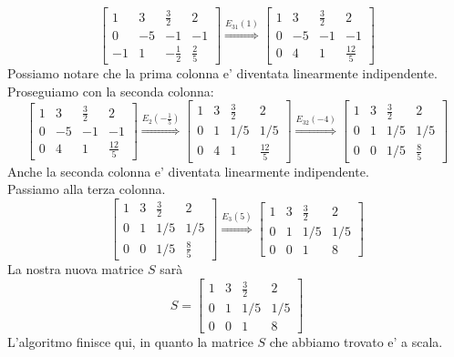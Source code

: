 \documentclass[a4paper, 10pt]{article}
\begin{document}
	\[
		\begin{bmatrix}
			1 & 3 & \frac{3}{2} & 2 \\
			0 & -5 & -1 & -1 \\
			-1 & 1 & -\frac{1}{2} &  \frac{2}{5}
		\end{bmatrix}
		\stackrel{E_{31}(1)}{\Longrightarrow}	
		\begin{bmatrix}
			1 & 3 & \frac{3}{2} & 2 \\
			0 & -5 & -1 & -1 \\
			0 & 4 & 1 &  \frac{12}{5}
		\end{bmatrix}
	\] 
	Possiamo notare che la prima colonna e' diventata linearmente indipendente. \\
	Proseguiamo con la seconda colonna:
	\[
		\begin{bmatrix}
			1 & 3 & \frac{3}{2} & 2 \\
			0 & -5 & -1 & -1 \\
			0 & 4 & 1 &  \frac{12}{5}
		\end{bmatrix}
		\stackrel{E_{2}(- \frac{1}{5})}{\Longrightarrow}
		\begin{bmatrix}
			1 & 3 & \frac{3}{2} & 2 \\
			0 & 1 & 1/5 & 1/5 \\
			0 & 4 & 1 &  \frac{12}{5}
		\end{bmatrix}
		\stackrel{E_{32}(-4)}{\Longrightarrow}				
		\begin{bmatrix}
			1 & 3 & \frac{3}{2} & 2 \\
			0 & 1 & 1/5 & 1/5 \\
			0 & 0 & 1/5 &  \frac{8}{5}
		\end{bmatrix}
	\]
	Anche la seconda colonna e' diventata linearmente indipendente.\\ 
	Passiamo alla terza colonna.
	\[
		\begin{bmatrix}
			1 & 3 & \frac{3}{2} & 2 \\
			0 & 1 & 1/5 & 1/5 \\
			0 & 0 & 1/5 &  \frac{8}{5}
		\end{bmatrix} 
		\stackrel{E_{3}(5)}{\Longrightarrow}
		\begin{bmatrix}
			1 & 3 & \frac{3}{2} & 2 \\
			0 & 1 & 1/5 & 1/5 \\
			0 & 0 & 1 &  8
		\end{bmatrix} 
	\]
	La nostra nuova matrice $S$ sarà 
	\[	
		S = 
		\begin{bmatrix}
			1 & 3 & \frac{3}{2} & 2 \\
			0 & 1 & 1/5 & 1/5 \\
			0 & 0 & 1 &  8
		\end{bmatrix}
	\]
	L'algoritmo finisce qui, in quanto la matrice $S$ che abbiamo trovato e' a scala.\\
	
\end{document}
